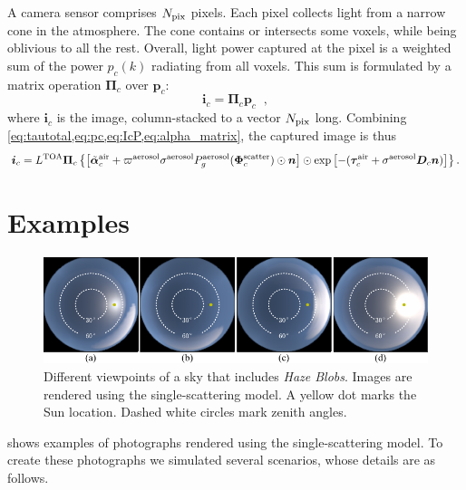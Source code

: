 \documentclass[10pt,letterpaper]{article}
\newcommand{\vect}[1]{\bm{#1}}
\newcommand{\yoavcomment}[1]{}
\renewcommand{\yoavcomment}[1]{#1} %
\begin{document}
A camera sensor comprises $N_{\rm pix}$ pixels. Each pixel collects light from a narrow cone in the
atmosphere. The cone contains or intersects some voxels, while being
oblivious to all the rest.  Overall, light power captured at the pixel
is a weighted sum of the power $p_c(k)$ radiating from all voxels.  This sum is
formulated by a matrix operation ${\vect{\Pi}}_c$ over ${\bm p}_c$:
\begin{equation}
  {\bm i}_c= {\vect{\Pi}}_c{\bm p}_c
  \;\;,
  \label{eq:IcP}
\end{equation}
where ${\bm i}_c$ is the image, column-stacked to a vector $N_{\rm
  pix}$ long.  Combining
\cref{eq:tautotal,eq:pc,eq:IcP,eq:alpha_matrix}, the captured image is thus
\begin{align}
  {\bm i}_c= L^{\rm TOA} {\vect{\Pi}}_c \left\{
  \left[\tilde{\vect{\alpha}}^{\rm air}_c + \varpi^{\rm aerosol}\sigma^{\rm
    aerosol} P^{\rm aerosol}_g(\vect{\Phi}^{\rm scatter}_c) \odot{\bm
    n} \right] \odot \exp\left[-(\vect{\tau}_c^{\rm air} + {\sigma}^{\rm aerosol}
  {\bm D}_c{\bm n})\right] \right\} .
  \label{eq:bigIA}
\end{align}


\section{Examples}
\label{sec:simul}

\begin{figure}
  \centering
  \yoavcomment{\includegraphics[width=\linewidth]{images/single_images.pdf}}
  \caption{\small Different viewpoints of a sky that includes {\em
      Haze Blobs}. Images are rendered using the single-scattering model.
    A yellow dot marks the Sun location. Dashed white circles mark
    zenith angles.}
  \label{fig:simulation-results1}
\end{figure}
 shows examples of photographs rendered
using the single-scattering model. To create these photographs we
simulated several scenarios, whose details are as follows.
\\
\end{document}
